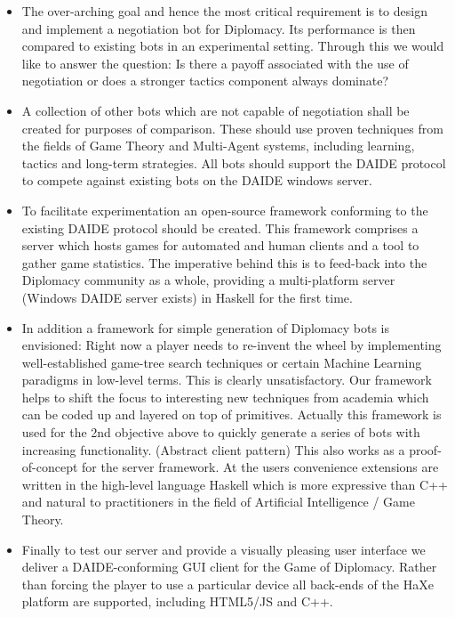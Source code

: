 \documentclass[pdftex,12pt,a4paper]{report}
\begin{document}
\begin{itemize}

\item The over-arching goal and hence the most critical requirement is
  to design and implement a negotiation bot for Diplomacy. Its
  performance is then compared to existing bots in an experimental
  setting. Through this we would like to answer the question: Is there
  a payoff associated with the use of negotiation or does a stronger
  tactics component always dominate? 

\item A collection of other bots which are not capable of negotiation
  shall be created for purposes of comparison. These should use
  proven techniques from the fields of Game Theory and Multi-Agent
  systems, including learning, tactics and long-term strategies. All
  bots should support the DAIDE protocol to compete against existing
  bots on the DAIDE windows server.

\item To facilitate experimentation an open-source framework
  conforming to the existing DAIDE protocol should be created. This
  framework comprises a server which hosts games for automated and
  human clients and a tool to gather game statistics. The imperative
  behind this is to feed-back into the Diplomacy community as a whole,
  providing a multi-platform server (Windows DAIDE server exists) in 
  Haskell for the first time.

\item In addition a framework for simple generation of Diplomacy bots
  is envisioned: Right now a player needs to re-invent the wheel by
  implementing well-established game-tree search techniques or certain
  Machine Learning paradigms in low-level terms. This is clearly
  unsatisfactory. Our framework helps to shift the focus to
  interesting new techniques from academia which can be coded up and
  layered on top of primitives. Actually this framework is used for
  the 2nd objective above to quickly generate a series of bots with
  increasing functionality.  (Abstract client pattern) This also works
  as a proof-of-concept for the server framework. At the users
  convenience extensions are written in the high-level language
  Haskell which is more expressive than C++ and natural to
  practitioners in the field of Artificial Intelligence / Game Theory.

\item Finally to test our server and provide a visually pleasing user
  interface we deliver a DAIDE-conforming GUI client for the Game
  of Diplomacy.  Rather than forcing the player to use a particular
  device all back-ends of the HaXe platform are supported, including
  HTML5/JS and C++.

\end{itemize}
\end{document}
